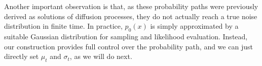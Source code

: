 \documentclass{article}
\newcommand{\yl}[1]{{\color{magenta}{\bf[Yaron:} #1{\bf]}}}
\def\gN{{\mathcal{N}}}
\begin{document}
Another important observation is that, as these probability paths were previously derived as solutions of diffusion processes, they do not actually reach a true noise distribution in finite time. In practice, $p_0(x)$ is simply approximated by a suitable Gaussian distribution for sampling and likelihood evaluation. Instead, our construction provides full control over the probability path, and we can just directly set $\mu_t$ and $\sigma_t$, as we will do next.


\end{document}

